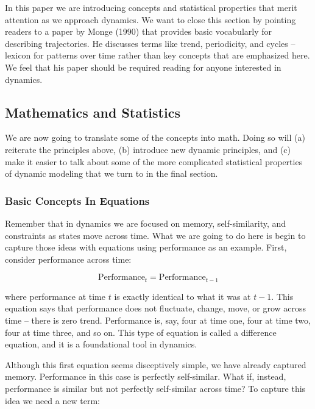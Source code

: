 \documentclass[english,,man]{apa6}
\theoremstyle{definition}
\theoremstyle{definition}
\theoremstyle{definition}
\theoremstyle{remark}
\begin{document}
In this paper we are introducing concepts and statistical properties
that merit attention as we approach dynamics. We want to close this
section by pointing readers to a paper by Monge (1990) that provides
basic vocabularly for describing trajectories. He discusses terms like
trend, periodicity, and cycles -- lexicon for patterns over time rather
than key concepts that are emphasized here. We feel that his paper
should be required reading for anyone interested in dynamics.

\hypertarget{mathematics-and-statistics}{%
\subsection{Mathematics and
Statistics}\label{mathematics-and-statistics}}

We are now going to translate some of the concepts into math. Doing so
will (a) reiterate the principles above, (b) introduce new dynamic
principles, and (c) make it easier to talk about some of the more
complicated statistical properties of dynamic modeling that we turn to
in the final section.

\hypertarget{basic-concepts-in-equations}{%
\subsubsection{Basic Concepts In
Equations}\label{basic-concepts-in-equations}}

Remember that in dynamics we are focused on memory, self-similarity, and
constraints as states move across time. What we are going to do here is
begin to capture those ideas with equations using performance as an
example. First, consider performance across time:

\begin{equation}
\textrm{Performance}_{t} = \textrm{Performance}_{t-1}
\end{equation}

\noindent where performance at time \(t\) is exactly identical to what
it was at \(t-1\). This equation says that performance does not
fluctuate, change, move, or grow across time -- there is zero trend.
Performance is, say, four at time one, four at time two, four at time
three, and so on. This type of equation is called a difference equation,
and it is a foundational tool in dynamics.

Although this first equation seems disceptively simple, we have already
captured memory. Performance in this case is perfectly self-similar.
What if, instead, performance is similar but not perfectly self-similar
across time? To capture this idea we need a new term:
\end{document}
